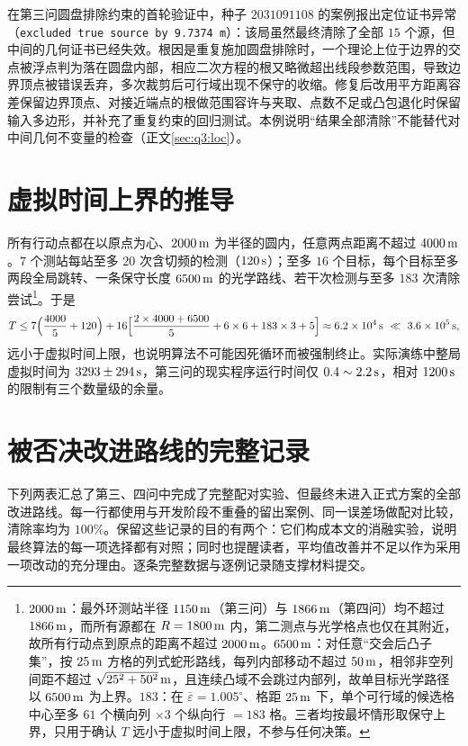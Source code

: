 \begin{appendices}
在第三问圆盘排除约束的首轮验证中，种子 $2031091108$ 的案例报出定位证书异常（\texttt{excluded true source by 9.7374\,m}）：该局虽然最终清除了全部 $15$ 个源，但中间的几何证书已经失效。根因是重复施加圆盘排除时，一个理论上位于边界的交点被浮点判为落在圆盘内部，相应二次方程的根又略微超出线段参数范围，导致边界顶点被错误丢弃，多次裁剪后可行域出现不保守的收缩。修复后改用平方距离容差保留边界顶点、对接近端点的根做范围容许与夹取、点数不足或凸包退化时保留输入多边形，并补充了重复约束的回归测试。本例说明“结果全部清除”不能替代对中间几何不变量的检查（正文\cref{sec:q3:loc}）。

\section{虚拟时间上界的推导}\label{app:bound}

所有行动点都在以原点为心、$2000\,\mathrm{m}$ 为半径的圆内，任意两点距离不超过 $4000\,\mathrm{m}$。$7$ 个测站每站至多 $20$ 次含切频的检测（$120\,\mathrm{s}$）；至多 $16$ 个目标，每个目标至多两段全局跳转、一条保守长度 $6500\,\mathrm{m}$ 的光学路线、若干次检测与至多 $183$ 次清除尝试\footnote{$2000\,\mathrm{m}$：最外环测站半径 $1150\,\mathrm{m}$（第三问）与 $1866\,\mathrm{m}$（第四问）均不超过 $1866\,\mathrm{m}$，而所有源都在 $R=1800\,\mathrm{m}$ 内，第二测点与光学格点也仅在其附近，故所有行动点到原点的距离不超过 $2000\,\mathrm{m}$。$6500\,\mathrm{m}$：对任意“交会后凸子集”，按 $25\,\mathrm{m}$ 方格的列式蛇形路线，每列内部移动不超过 $50\,\mathrm{m}$，相邻非空列间距不超过 $\sqrt{25^2+50^2}\,\mathrm{m}$，且连续凸域不会跳过内部列，故单目标光学路径以 $6500\,\mathrm{m}$ 为上界。$183$：在 $\bar\varepsilon=1.005^\circ$、格距 $25\,\mathrm{m}$ 下，单个可行域的候选格中心至多 $61$ 个横向列 $\times3$ 个纵向行 $=183$ 格。三者均按最坏情形取保守上界，只用于确认 $T$ 远小于虚拟时间上限，不参与任何决策。}。于是
\begin{equation}
  T\le 7\Bigl(\frac{4000}{5}+120\Bigr)+16\Bigl[\frac{2\times4000+6500}{5}+6\times6+183\times3+5\Bigr]
  \approx6.2\times10^{4}\,\mathrm{s}\ \ll\ 3.6\times10^{5}\,\mathrm{s},
\end{equation}
远小于虚拟时间上限，也说明算法不可能因死循环而被强制终止。实际演练中整局虚拟时间为 $3293\pm294\,\mathrm{s}$，第三问的现实程序运行时间仅 $0.4\sim2.2\,\mathrm{s}$，相对 $1200\,\mathrm{s}$ 的限制有三个数量级的余量。


\section{被否决改进路线的完整记录}\label{app:ablation}

下列两表汇总了第三、四问中完成了完整配对实验、但最终未进入正式方案的全部改进路线。每一行都使用与开发阶段不重叠的留出案例、同一误差场做配对比较，清除率均为 $100\%$。保留这些记录的目的有两个：它们构成本文的消融实验，说明最终算法的每一项选择都有对照；同时也提醒读者，平均值改善并不足以作为采用一项改动的充分理由。逐条完整数据与逐例记录随支撑材料提交。


\end{appendices}
